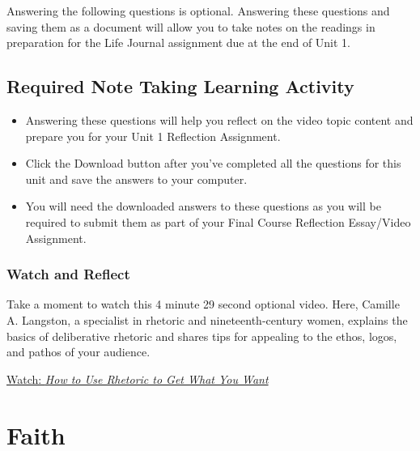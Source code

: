 \documentclass[
]{book}
\providecommand{\tightlist}{%
  \setlength{\itemsep}{0pt}\setlength{\parskip}{0pt}}
\begin{document}
\begin{reflect}
Answering the following questions is optional. Answering these questions and saving them as a document will allow you to take notes on the readings in preparation for the Life Journal assignment due at the end of Unit 1.
\end{reflect}

\hypertarget{required-note-taking-learning-activity}{%
\section*{Required Note Taking Learning Activity}\label{required-note-taking-learning-activity}}

\begin{reflect}
\begin{itemize}
\tightlist
\item
  Answering these questions will help you reflect on the video topic content and prepare you for your Unit 1 Reflection Assignment.
\item
  Click the Download button after you've completed all the questions for this unit and save the answers to your computer.
\item
  You will need the downloaded answers to these questions as you will be required to submit them as part of your Final Course Reflection Essay/Video Assignment.
\end{itemize}
\end{reflect}

\hypertarget{watch-and-reflect-8}{%
\subsection*{Watch and Reflect}\label{watch-and-reflect-8}}

\begin{reflect}
Take a moment to watch this 4 minute 29 second optional video. Here, Camille A. Langston, a specialist in rhetoric and nineteenth-century women, explains the basics of deliberative rhetoric and shares tips for appealing to the ethos, logos, and pathos of your audience.

\href{https://www.youtube.com/watch?v=3klMM9BkW5o}{Watch: \emph{How to Use Rhetoric to Get What You Want}}
\end{reflect}

\hypertarget{faith}{%
\chapter{Faith}\label{faith}}
\end{document}
